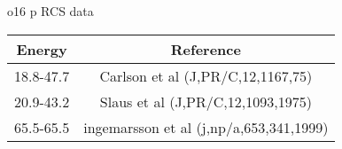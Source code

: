 \caption{o16 p RCS data}\begin{tabular}{|c||c|} 
 \hline 
\bf{Energy} & \bf{Reference} \\
 \hline
 \hline 
18.8-47.7 & Carlson et al (J,PR/C,12,1167,75)\\
20.9-43.2 & Slaus et al (J,PR/C,12,1093,1975)\\
65.5-65.5 & ingemarsson et al (j,np/a,653,341,1999)\\
\end{tabular}